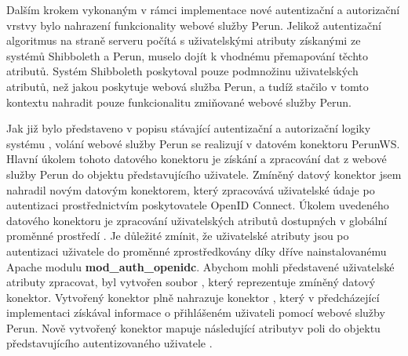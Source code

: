 \documentclass[
  printed, %
  twoside, %
  table,   %
  nolof,     %
  nolot,     %
]{fithesis3}
\begin{document}
\par 
Dalším krokem vykonaným v rámci implementace nové autentizační a autorizační vrstvy bylo nahrazení funkcionality webové služby Perun.  
Jelikož autentizační algoritmus na straně serveru  počítá s uživatelskými atributy získanými ze systémů Shibboleth a Perun, muselo dojít k vhodnému přemapování těchto atributů. Systém Shibboleth poskytoval pouze podmnožinu uživatelských atributů, než jakou poskytuje webová služba Perun, a tudíž stačilo v tomto kontextu nahradit pouze funkcionalitu zmiňované webové služby Perun. \par

Jak již bylo představeno v popisu stávající autentizační a autorizační logiky systému , volání webové služby Perun se realizují v datovém konektoru PerunWS. Hlavní úkolem tohoto datového konektoru je získání a zpracování dat z webové služby Perun do objektu představujícího uživatele. Zmíněný datový konektor jsem nahradil novým datovým konektorem, který zpracovává uživatelské údaje po autentizaci prostřednictvím poskytovatele OpenID Connect. Úkolem uvedeného datového konektoru je zpracování uživatelských atributů dostupných v globální proměnné prostředí . Je důležité zmínit, že uživatelské atributy jsou po autentizaci uživatele do proměnné  zprostředkovány díky dříve nainstalovanému Apache modulu \textbf{mod\_auth\_openidc}. Abychom mohli představené uživatelské atributy zpracovat, byl vytvořen soubor , který reprezentuje zmíněný datový konektor. Vytvořený konektor  plně nahrazuje konektor , který v předcházející implementaci získával informace o přihlášeném uživateli pomocí webové služby Perun. Nově vytvořený konektor mapuje následující atributy\break v poli  do objektu představujícího autentizovaného uživatele . 
\end{document}

